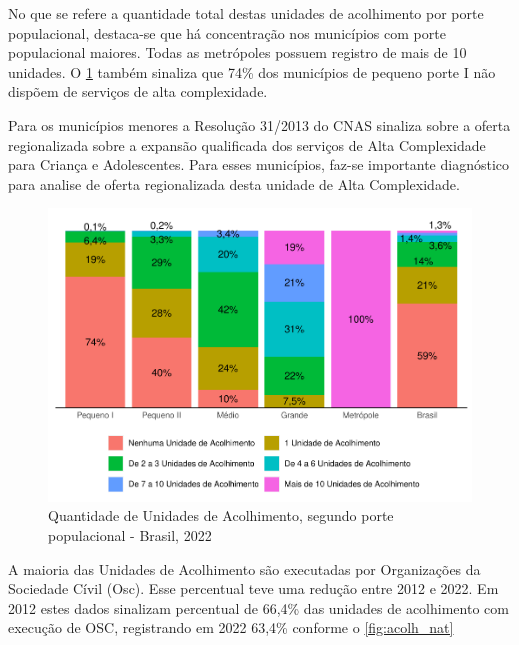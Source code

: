 \documentclass[
  brazilian]{report}
\begin{document}
No que se refere a quantidade total destas unidades de acolhimento por
porte populacional, destaca-se que há concentração nos municípios com
porte populacional maiores. Todas as metrópoles possuem registro de mais
de 10 unidades. O \cref{fig:unac-porte} também sinaliza que 74\% dos
municípios de pequeno porte I não dispõem de serviços de alta
complexidade.

Para os municípios menores a Resolução 31/2013 do CNAS sinaliza sobre a
oferta regionalizada sobre a expansão qualificada dos serviços de Alta
Complexidade para Criança e Adolescentes. Para esses municípios, faz-se
importante diagnóstico para analise de oferta regionalizada desta
unidade de Alta Complexidade.

\begin{figure}
\includegraphics{Censo-SUAS-2022_files/figure-latex/unac-porte-1} \caption[Quantidade de Unidades de Acolhimento, segundo porte populacional - Brasil, 2022]{Quantidade de Unidades de Acolhimento, segundo porte populacional - Brasil, 2022}\label{fig:unac-porte}
\end{figure}

A maioria das Unidades de Acolhimento são executadas por Organizações da
Sociedade Cívil (Osc). Esse percentual teve uma redução entre 2012 e
2022. Em 2012 estes dados sinalizam percentual de 66,4\% das unidades de
acolhimento com execução de OSC, registrando em 2022 63,4\% conforme o
\cref{fig:acolh_nat}
\end{document}
